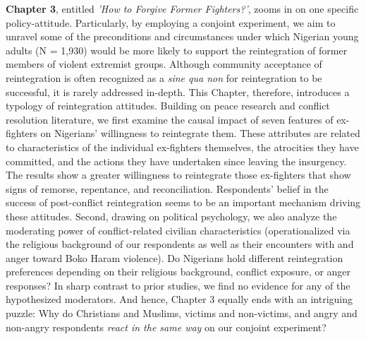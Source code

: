 \textbf{Chapter 3}, entitled \textit{'How to Forgive Former Fighters?'}, zooms in on one specific policy-attitude. Particularly, by employing a conjoint experiment, we aim to unravel some of the preconditions and circumstances under which Nigerian young adults (N = 1,930) would be more likely to support the reintegration of former members of violent extremist groups. Although community acceptance of reintegration is often recognized as a \textit{sine qua non} for reintegration to be successful, it is rarely addressed in-depth. This Chapter, therefore, introduces a typology of reintegration attitudes. Building on peace research and conflict resolution literature, we first examine the causal impact of seven features of ex-fighters on Nigerians' willingness to reintegrate them. These attributes are related to characteristics of the individual ex-fighters themselves, the atrocities they have committed, and the actions they have undertaken since leaving the insurgency. The results show a greater willingness to reintegrate those ex-fighters that show signs of remorse, repentance, and reconciliation. Respondents’ belief in the success of post-conflict reintegration seems to be an important mechanism driving these attitudes. Second, drawing on political psychology, we also analyze the moderating power of conflict-related civilian characteristics (operationalized via the religious background of our respondents as well as their encounters with and anger toward Boko Haram violence). Do Nigerians hold different reintegration preferences depending on their religious background, conflict exposure, or anger responses? In sharp contrast to prior studies, we find no evidence for any of the hypothesized moderators. And hence, Chapter 3 equally ends with an intriguing puzzle: Why do Christians and Muslims, victims and non-victims, and angry and non-angry respondents \textit{react in the same way} on our conjoint experiment?


